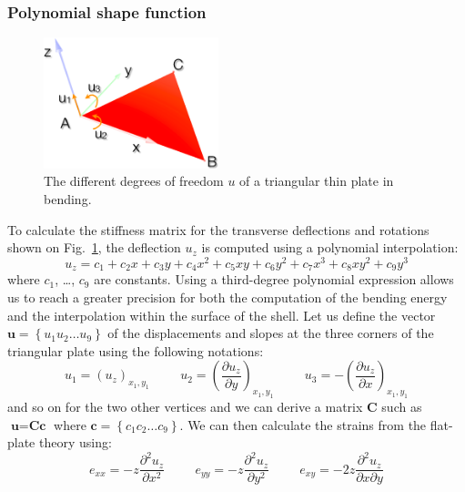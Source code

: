 \documentclass{llncs}
\begin{document}
\subsubsection{Polynomial shape function}
%
\begin{figure}
\vspace{-1.3cm}
\centering
\includegraphics[height=3.8cm]{images/bending}
\vspace{-0.2cm}
\caption {The different degrees of freedom $u$ of a triangular thin plate in bending.}
\label{fig-triangle}
\vspace{-0.5cm}
\end{figure}
%
To calculate the stiffness matrix for the transverse deflections and rotations shown on Fig.~\ref{fig-triangle}, the deflection $u_z$ is computed using a polynomial interpolation:
\begin{equation}
 u_z = c_1 + c_2x + c_3y + c_4x^2 + c_5xy + c_6y^2 + c_7x^3 + c_8xy^2 + c_9y^3
\label{eq-deflection}
\end{equation} 
where $c_1$, \ldots , $c_9$ are constants. Using a third-degree polynomial expression allows us to reach a greater precision for both the computation of the bending energy and the interpolation within the surface of the shell. Let us define the vector $\textbf{u} = \left\{u_1 u_2 \ldots u_9 \right\} $ of the displacements and slopes at the three corners of the triangular plate using the following notations:
\begin{equation}
u_1 = (u_z)_{x_1,y_1} \hspace{1cm} u_2 = \left(\frac{\partial u_z}{\partial y}\right)_{x_1,y_1} \hspace{1cm} u_3 = - \left(\frac{\partial u_z}{\partial x}\right)_{x_1,y_1}
\end{equation} 
and so on for the two other vertices and we can derive a matrix $\textbf{C}$ such as $\textbf{u} = \textbf{Cc}$ where $\textbf{c} = \left\{c_1 c_2 \ldots c_9 \right\} $. We can then calculate the strains from the flat-plate theory using:
\begin{equation}
\label{eq-deformation}
e_{xx} = -z \frac{\partial^2u_z}{\partial x^2}
\hspace{1cm}
e_{yy} = -z \frac{\partial^2u_z}{\partial y^2}
\hspace{1cm}
e_{xy} = -2z \frac{\partial^2u_z}{\partial x \partial y}
\end{equation} 
\end{document}
